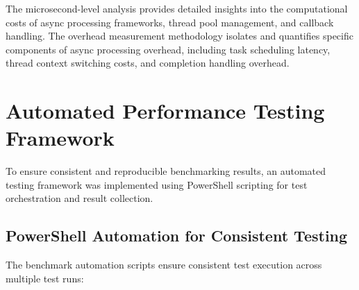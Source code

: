 The microsecond-level analysis provides detailed insights into the computational costs of async processing frameworks, thread pool management, and callback handling. The overhead measurement methodology isolates and quantifies specific components of async processing overhead, including task scheduling latency, thread context switching costs, and completion handling overhead.


\section{Automated Performance Testing Framework}

To ensure consistent and reproducible benchmarking results, an automated testing framework was implemented using PowerShell scripting for test orchestration and result collection.

\subsection{PowerShell Automation for Consistent Testing}

The benchmark automation scripts ensure consistent test execution across multiple test runs:


